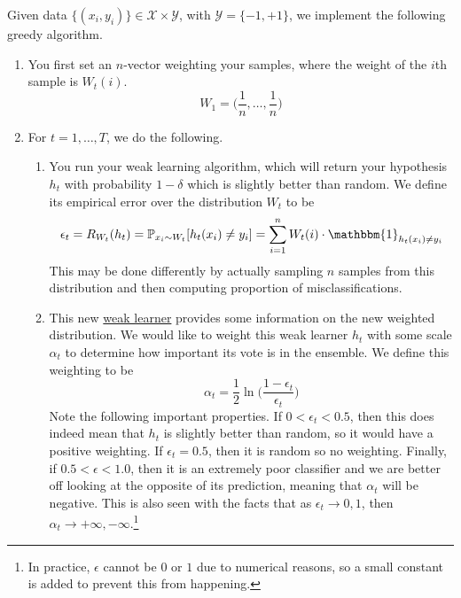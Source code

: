   \begin{definition}
    \label{def:adaboost-for-binary-classification}
    Given data $\{(x_i, y_i)\} \in \mathcal{X} \times \mathcal{Y}$, with $\mathcal{Y} = \{-1, +1\}$, we implement the following greedy algorithm. 
    \begin{enumerate}
      \item You first set an $n$-vector weighting your samples, where the weight of the $i$th sample is $W_t (i)$. 
        \begin{equation}
          W_1 = \big( \frac{1}{n}, \ldots, \frac{1}{n} \big)
        \end{equation}

      \item For $t = 1, \ldots, T$, we do the following. 
        \begin{enumerate}
          \item You run your weak learning algorithm, which will return your hypothesis $h_t$ with probability $1 - \delta$ which is slightly better than random. We define its empirical error over the distribution $W_t$ to be 
            \begin{equation}
              \epsilon_t = R_{W_t} (h_t) = \mathbb{P}_{x_i \sim W_t} [ h_t (x_i) \neq y_i] = \sum_{i=1}^n W_t (i) \cdot \mathbbm{1}_{h_t (x_i) \neq y_i}
            \end{equation}
            This may be done differently by actually sampling $n$ samples from this distribution and then computing proportion of misclassifications. 

          \item This new \hyperref[def:weak-learner]{weak learner} provides some information on the new weighted distribution. We would like to weight this weak learner $h_t$ with some scale $\alpha_t$ to determine how important its vote is in the ensemble. We define this weighting to be 
            \begin{equation}
              \alpha_t = \frac{1}{2} \ln \bigg( \frac{1 - \epsilon_t}{\epsilon_t} \bigg)
            \end{equation}
          Note the following important properties. If $0 < \epsilon_t < 0.5$, then this does indeed mean that $h_t$ is slightly better than random, so it would have a positive weighting. If $\epsilon_t = 0.5$, then it is random so no weighting. Finally, if $0.5 < \epsilon < 1.0$, then it is an extremely poor classifier and we are better off looking at the opposite of its prediction, meaning that $\alpha_t$ will be negative.
          This is also seen with the facts that as $\epsilon_t \rightarrow 0, 1$, then $\alpha_t \rightarrow +\infty, -\infty$.\footnote{In practice, $\epsilon$ cannot be $0$ or $1$ due to numerical reasons, so a small constant is added to prevent this from happening.} 


\end{enumerate}
\end{enumerate}
\end{definition}
